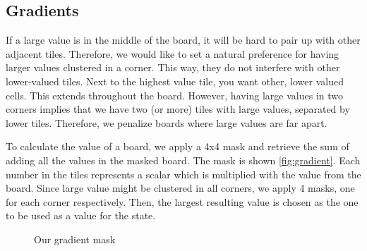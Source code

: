 \documentclass[journal]{IEEEtran}
\begin{document}
\subsection*{Gradients}
If a large value is in the middle of the board, it will be hard to pair up
with other adjacent tiles. Therefore, we would like to set a natural preference
for having larger values clustered in a corner. This way, they do not interfere
with other lower-valued tiles. Next to the highest value tile, you want other,
lower valued cells. This extends throughout the board. However, having large values
in two corners implies that we have two (or more) tiles with large values, separated
by lower tiles. Therefore, we penalize boards where large values are far apart.

To calculate the value of a board, we apply a 4x4 mask and retrieve the
sum of adding all the values in the masked board.
The mask is shown \autoref{fig:gradient}. Each number in the tiles represents a scalar
which is multiplied with the value from the board. Since large value might be clustered
in all corners, we apply 4 masks, one for each corner respectively. Then,
the largest resulting value is chosen as the one to be used as a value for the state.

\begin{figure}[Hb]
\centering
    \caption{Our gradient mask}
\label{fig:gradient}
\end{figure}
\end{document}

